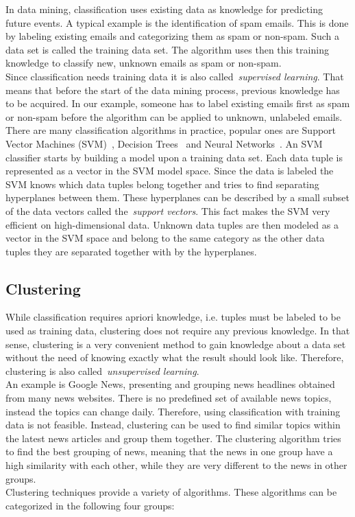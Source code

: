 In data mining, classification uses existing data as knowledge for predicting future events. A typical example is the identification of spam emails. This is done by labeling existing emails and categorizing them as spam or non-spam. Such a data set is called the training data set. The algorithm uses then this training knowledge to classify new, unknown emails as spam or non-spam.
\\
Since classification needs training data it is also called~\emph{supervised learning}. That means that before the start of the data mining process, previous knowledge has to be acquired. In our example, someone has to label existing emails first as spam or non-spam before the algorithm can be applied to unknown, unlabeled emails. 
\\
There are many classification algorithms in practice, popular ones are Support Vector Machines (SVM)~\parencite{svm}, Decision Trees~\parencite{descisiontree} and Neural Networks~\parencite{neuralnetwork}.
An SVM classifier starts by building a model upon a training data set. Each data tuple is represented as a vector in the SVM model space. Since the data is labeled the SVM knows which data tuples belong together and tries to find separating hyperplanes between them. These hyperplanes can be described by a small subset of the data vectors called the~\emph{support vectors}. This fact makes the SVM very efficient on high-dimensional data. Unknown data tuples are then modeled as a vector in the SVM space and belong to the same category as the other data tuples they are separated together with by the hyperplanes.

\subsection{Clustering}

While classification requires apriori knowledge, i.e. tuples must be labeled to be used as training data, clustering does not require any previous knowledge. In that sense, clustering is a very convenient method to gain knowledge about a data set without the need of knowing exactly what the result should look like. Therefore, clustering is also called~\emph{unsupervised learning}.
\\
An example is Google News, presenting and grouping news headlines obtained from many news websites. There is no predefined set of available news topics, instead the topics can change daily. Therefore, using classification with training data is not feasible. Instead, clustering can be used to find similar topics within the latest news articles and group them together. The clustering algorithm tries to find the best grouping of news, meaning that the news in one group have a high similarity with each other, while they are very different to the news in other groups. 
\\
Clustering techniques provide a variety of algorithms. These algorithms can be categorized in the following four groups:

